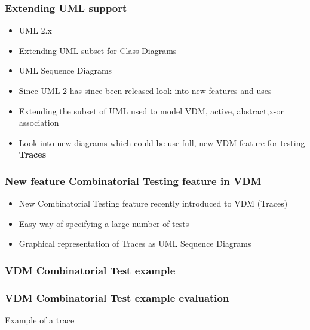 %
%
\frame
{
  \frametitle{Extending UML support}
\begin{center}
  \begin{itemize}
  		\item UML 2.x
  		\item Extending UML subset for Class Diagrams
  		\item UML Sequence Diagrams
	  	
  \end{itemize}

\end{center}
}

\note
{

  \begin{itemize}
  		\item Since UML 2 has since been released look into new features and uses
  		\item Extending the subset of UML used to model VDM, active, abstract,x-or association
  		\item Look into new diagrams which could be use full, new VDM feature for testing \textbf{Traces}
	  	
  \end{itemize}

}


%
%
\frame
{
  \frametitle{New feature Combinatorial Testing feature in VDM}
\begin{center}
  \begin{itemize}
  		\item New Combinatorial Testing feature recently introduced to VDM (Traces)
  		\item Easy way of specifying a large number of tests
  		\item Graphical representation of Traces as UML Sequence Diagrams
	  	
  \end{itemize}

\end{center}
}

%
%
\frame
{
  \frametitle{VDM Combinatorial Test example}
\begin{center}

\end{center}
}

%
%
\frame
{
  \frametitle{VDM Combinatorial Test example evaluation}
\begin{center}
Example of a trace

\end{center}
}


